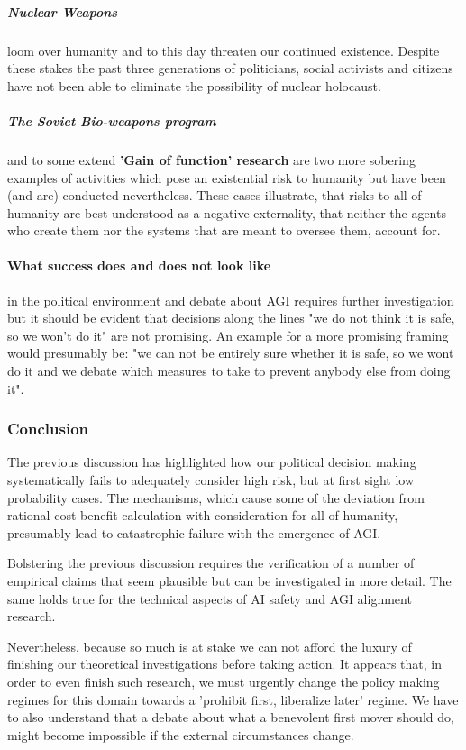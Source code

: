 \documentclass[12pt, a4paper]{article}
\begin{document}
				\subparagraph{Nuclear Weapons}
					loom over humanity and to this day threaten our continued existence.
					Despite these stakes the past three generations of politicians, social activists and citizens have not been able to eliminate the possibility of nuclear holocaust.
				
				\subparagraph[Soviet Bio-weapons program]{The Soviet Bio-weapons program }
					and to some extend \textbf{'Gain of function' research} are two more sobering examples of activities which pose an existential risk to humanity but have been (and are) conducted nevertheless.
					These cases illustrate, that risks to all of humanity are best understood as a negative externality, that neither the agents who create them nor the systems that are meant to oversee them, account for.
			
			\paragraph{What success does and does not look like}
				in the political environment and debate about AGI requires further investigation but it should be evident that decisions along the lines "we do not think it is safe, so we won't do it" are not promising.
				An example for a more promising framing would presumably be: "we can not be entirely sure whether it is safe, so we wont do it and we debate which measures to take to prevent anybody else from doing it".

		\subsubsection{Conclusion}
			The previous discussion has highlighted how our political decision making systematically fails to adequately consider high risk, but at first sight low probability cases.
			The mechanisms, which cause some of the deviation from rational cost-benefit calculation with consideration for all of humanity, presumably lead to catastrophic failure with the emergence of AGI.
			
			Bolstering the previous discussion requires the verification of a number of empirical claims that seem plausible but can be investigated in more detail.
			The same holds true for the technical aspects of AI safety and AGI alignment research.
			
			Nevertheless, because so much is at stake we can not afford the luxury of finishing our theoretical investigations before taking action.
			It appears that, in order to even finish such research, we must urgently change the policy making regimes for this domain towards a 'prohibit first, liberalize later' regime.
			We have to also understand that a debate about what a benevolent first mover should do, might become impossible if the external circumstances change.
			
\end{document}
